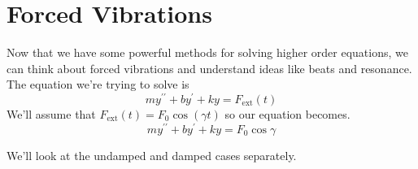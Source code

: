 \section{Forced Vibrations}
\noindent
Now that we have some powerful methods for solving higher order equations, we can think about forced vibrations and understand ideas like beats and resonance.\\

\noindent
The equation we're trying to solve is
\begin{equation*}
	my^{\prime\prime} + by^{\prime} + ky = F_{\text{ext}}(t)
\end{equation*}
We'll assume that $F_{\text{ext}}(t) = F_0\cos{(\gamma t)}$ so our equation becomes.
\begin{equation*}
	my^{\prime\prime} + by^{\prime} + ky = F_0\cos{\gamma}
\end{equation*}

\noindent
We'll look at the undamped and damped cases separately.


